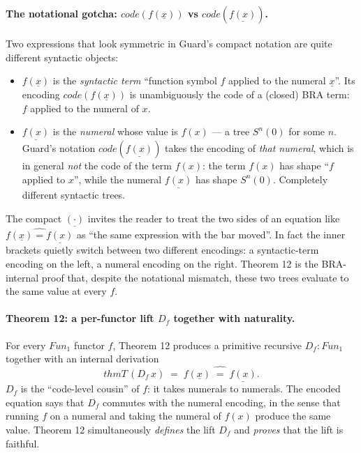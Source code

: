 \documentclass[11pt]{article}
\begin{document}
\paragraph{The notational gotcha: $\mathit{code}(f(\underline{x}))$ vs $\mathit{code}(\underline{f(x)})$.}
Two expressions that look symmetric in Guard's compact notation are
quite different syntactic objects:
\begin{itemize}
  \item $f(\underline{x})$ is the \emph{syntactic term} ``function
        symbol $f$ applied to the numeral $\underline{x}$''.  Its
        encoding $\mathit{code}(f(\underline{x}))$ is unambiguously
        the code of a (closed) BRA term: $f$ applied to the numeral
        of $x$.
  \item $\underline{f(x)}$ is the \emph{numeral} whose value is $f(x)$
        --- a tree $S^n(0)$ for some $n$.  Guard's notation
        $\mathit{code}(\underline{f(x)})$ takes the encoding of
        \emph{that numeral}, which is in general \emph{not} the code
        of the term $f(x)$: the term $f(x)$ has shape ``$f$ applied
        to $x$'', while the numeral $\underline{f(x)}$ has shape
        $S^n(0)$.  Completely different syntactic trees.
\end{itemize}
The compact $\underline{(\cdot)}$ invites the reader to treat the two
sides of an equation like $\widehat{f(\underline{x}) = \underline{f(x)}}$
as ``the same expression with the bar moved''.  In fact the inner
brackets quietly switch between two different encodings: a
syntactic-term encoding on the left, a numeral encoding on the right.
Theorem 12 is the BRA-internal proof that, despite the notational
mismatch, these two trees evaluate to the same value at every $f$.

\paragraph{Theorem 12: a per-functor lift $D_f$ together with naturality.}
For every $\mathit{Fun}_1$ functor $f$, Theorem 12 produces a primitive
recursive $D_f : \mathit{Fun}_1$ together with an internal derivation
\[
  \mathit{thmT}\,(D_f\,x) \;=\; \widehat{f(\underline{x}) \;=\; \underline{f(x)}}.
\]
$D_f$ is the ``code-level cousin'' of $f$: it takes numerals to
numerals.  The encoded equation says that $D_f$ commutes with the
numeral encoding, in the sense that running $f$ on a numeral and taking
the numeral of $f(x)$ produce the same value.  Theorem 12 simultaneously
\emph{defines} the lift $D_f$ and \emph{proves} that the lift is faithful.
\end{document}
